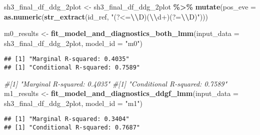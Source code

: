 \documentclass[
]{article}
\newenvironment{Shaded}{\begin{snugshade}}{\end{snugshade}}
\newcommand{\AttributeTok}[1]{\textcolor[rgb]{0.13,0.29,0.53}{#1}}
\newcommand{\CommentTok}[1]{\textcolor[rgb]{0.56,0.35,0.01}{\textit{#1}}}
\newcommand{\FunctionTok}[1]{\textcolor[rgb]{0.13,0.29,0.53}{\textbf{#1}}}
\newcommand{\NormalTok}[1]{#1}
\newcommand{\OtherTok}[1]{\textcolor[rgb]{0.56,0.35,0.01}{#1}}
\newcommand{\SpecialCharTok}[1]{\textcolor[rgb]{0.81,0.36,0.00}{\textbf{#1}}}
\newcommand{\StringTok}[1]{\textcolor[rgb]{0.31,0.60,0.02}{#1}}
\begin{document}
\begin{Shaded}
\begin{Highlighting}[]
\NormalTok{sh3\_final\_df\_ddg\_2plot }\OtherTok{\textless{}{-}}\NormalTok{ sh3\_final\_df\_ddg\_2plot }\SpecialCharTok{\%\textgreater{}\%}
  \FunctionTok{mutate}\NormalTok{(}\AttributeTok{pos\_eve =} \FunctionTok{as.numeric}\NormalTok{(}\FunctionTok{str\_extract}\NormalTok{(id\_ref, }\StringTok{"(?\textless{}=}\SpecialCharTok{\textbackslash{}\textbackslash{}}\StringTok{D)(}\SpecialCharTok{\textbackslash{}\textbackslash{}}\StringTok{d+)(?=}\SpecialCharTok{\textbackslash{}\textbackslash{}}\StringTok{D)"}\NormalTok{)))}

\NormalTok{m0\_results }\OtherTok{\textless{}{-}} \FunctionTok{fit\_model\_and\_diagnostics\_both\_lmm}\NormalTok{(}\AttributeTok{input\_data =}\NormalTok{ sh3\_final\_df\_ddg\_2plot, }\AttributeTok{model\_id =} \StringTok{"m0"}\NormalTok{)}
\end{Highlighting}
\end{Shaded}

\begin{verbatim}
## [1] "Marginal R-squared: 0.4035"
## [1] "Conditional R-squared: 0.7589"
\end{verbatim}

\begin{Shaded}
\begin{Highlighting}[]
\CommentTok{\#[1] "Marginal R{-}squared: 0.4035"}
\CommentTok{\#[1] "Conditional R{-}squared: 0.7589"}
\NormalTok{m1\_results }\OtherTok{\textless{}{-}} \FunctionTok{fit\_model\_and\_diagnostics\_ddgf\_lmm}\NormalTok{(}\AttributeTok{input\_data =}\NormalTok{ sh3\_final\_df\_ddg\_2plot, }\AttributeTok{model\_id =} \StringTok{"m1"}\NormalTok{)}
\end{Highlighting}
\end{Shaded}

\begin{verbatim}
## [1] "Marginal R-squared: 0.3404"
## [1] "Conditional R-squared: 0.7687"
\end{verbatim}
\end{document}
